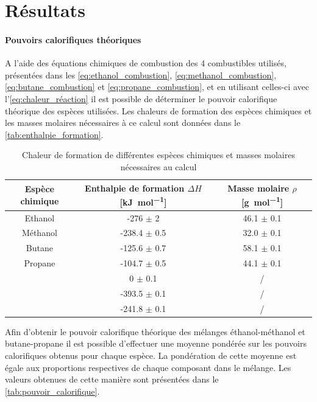 \section{Résultats}

\paragraph*{Pouvoirs calorifiques théoriques}
A l'aide des équations chimiques de combustion des 4 combustibles utilisés, présentées dans les \autoref{eq:ethanol_combustion}, \autoref{eq:methanol_combustion}, \autoref{eq:butane_combustion} et \autoref{eq:propane_combustion}, et en utilisant celles-ci avec l'\autoref{eq:chaleur_réaction} il est possible de déterminer le pouvoir calorifique théorique des espèces utilisées. Les chaleurs de formation des espèces chimiques et les masses molaires nécessaires à ce calcul sont données dans le \autoref{tab:enthalpie_formation}.

\begin{table}[h]
    \centering
    \begin{tabulary}{\linewidth}{C C C}
        \toprule
        Espèce chimique & Enthalpie de formation \(\Delta H\) [\si{\kilo\joule\per\mole}] & Masse molaire \(\rho\) [\si{\gram\per\mole}]\\
        \midrule
        Ethanol & -276 \(\pm\) 2 & 46.1 \(\pm\) 0.1 \\
        Méthanol & -238.4 \(\pm\) 0.5 & 32.0 \(\pm\) 0.1 \\
        Butane & -125.6 \(\pm\) 0.7 & 58.1 \(\pm\) 0.1\\
        Propane & -104.7 \(\pm\) 0.5 & 44.1 \(\pm\) 0.1\\
         & 0 \(\pm\) 0.1 & / \\
         & -393.5 \(\pm\) 0.1 & / \\
         & -241.8 \(\pm\) 0.1 & / \\
        \bottomrule
    \end{tabulary}
    \caption{Chaleur de formation de différentes espèces chimiques et masses molaires nécessaires au calcul \cite{notice} \cite{NIST}}
    \label{tab:enthalpie_formation}
\end{table}

Afin d'obtenir le pouvoir calorifique théorique des mélanges éthanol-méthanol et butane-propane il est possible d'effectuer une moyenne pondérée sur les pouvoirs calorifiques obtenus pour chaque espèce. La pondération de cette moyenne est égale aux proportions respectives de chaque composant dans le mélange. Les valeurs obtenues de cette manière sont présentées dans le \autoref{tab:pouvoir_calorifique}.

